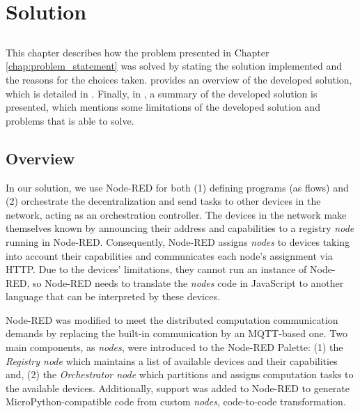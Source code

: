 \chapter{Solution} \label{chap:solution}

\section*{}

\minitoc \mtcskip \noindent
This chapter describes how the problem presented in Chapter \ref{chap:problem_statement} was solved by stating the solution implemented and the reasons for the choices taken.  provides an overview of the developed solution, which is detailed in . Finally, in , a summary of the developed solution is presented, which mentions some limitations of the developed solution and problems that is able to solve.

\section{Overview}\label{sec:solution_overview}

In our solution, we use Node-RED for both (1) defining programs (as flows) and (2) orchestrate the decentralization and send tasks to other devices in the network, acting as an orchestration controller. The devices in the network make themselves known by announcing their address and capabilities to a registry \textit{node} running in Node-RED. Consequently, Node-RED assigns \textit{nodes} to devices taking into account their capabilities and communicates each node's assignment via HTTP. Due to the devices' limitations, they cannot run an instance of Node-RED, so Node-RED needs to translate the \textit{nodes} code in JavaScript to another language that can be interpreted by these devices. 

Node-RED was modified to meet the distributed computation communication demands by replacing the built-in communication by an MQTT-based one. Two main components, as \textit{nodes}, were introduced to the Node-RED Palette: (1) the \textit{Registry node} which maintains a list of available devices and their capabilities and, (2) the \textit{Orchestrator node} which partitions and assigns computation tasks to the available devices. Additionally, support was added to Node-RED to generate MicroPython-compatible code from custom \textit{nodes}, \ie code-to-code transformation.


